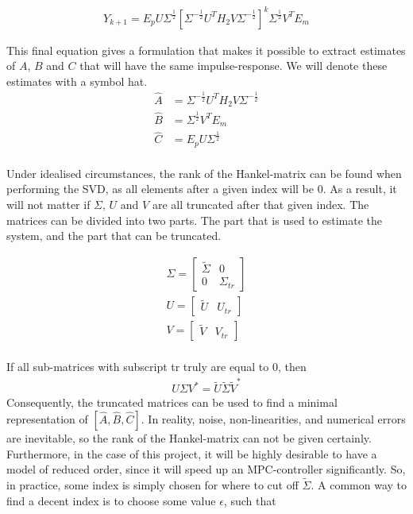 \begin{align}
    Y_{k+1} = E_p U \Sigma^{\frac{1}{2}} \left[ \Sigma^{-\frac{1}{2}} U^T H_2 V \Sigma^{-\frac{1}{2}} \right]^k \Sigma^{\frac{1}{2}} V^T E_m
\end{align}

This final equation gives a formulation that makes it possible to extract estimates of $A$, $B$ and $C$ that will have the same impulse-response. We will denote these estimates with a symbol hat. 
\begin{align}
    \hat{A} &= \Sigma^{-\frac{1}{2}} U^T H_2 V \Sigma^{-\frac{1}{2}} \\
    \hat{B} &= \Sigma^{\frac{1}{2}} V^T E_m \\
    \hat{C} &= E_p U \Sigma^{\frac{1}{2}}  \\
\end{align}


\noindent
Under idealised circumstances, the rank of the Hankel-matrix can be found when performing the SVD, as all elements after a given index will be 0. As a result, it will not matter if $\Sigma$, $U$ and $V$ are all truncated after that given index. The matrices can be divided into two parts. The part that is used to estimate the system, and the part that can be truncated. 

\begin{align}
    \Sigma = 
    \begin{bmatrix}
        \tilde{\Sigma} & 0 \\
        0 & \Sigma_{tr}
    \end{bmatrix}\\
    U = 
    \begin{bmatrix}
        \tilde{U} & U_{tr}
    \end{bmatrix}\\
    V = 
    \begin{bmatrix}
        \tilde{V} & V_{tr}
    \end{bmatrix}\\
\end{align}

If all sub-matrices with subscript tr truly are equal to 0, then 
\begin{align}
    U\Sigma V^* = \tilde{U}\tilde{\Sigma}\tilde{V}^*
\end{align}
\noindent
Consequently, the truncated matrices can be used to find a minimal representation of $\left[ \hat{A}, \hat{B}, \hat{C} \right]$. In reality, noise, non-linearities, and numerical errors are inevitable, so the rank of the Hankel-matrix can not be given certainly. Furthermore, in the case of this project, it will be highly desirable to have a model of reduced order, since it will speed up an MPC-controller significantly. 
\noindent
So, in practice, some index is simply chosen for where to cut off $\tilde{\Sigma}$. A common way to find a decent index is to choose some value $\epsilon$, such that 

